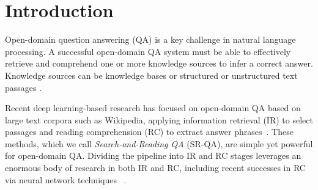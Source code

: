 \documentclass[letterpaper]{article} \usepackage{aaai18}  \usepackage{times}  \usepackage{helvet}  \usepackage{courier}  \usepackage{url}  \usepackage{graphicx}  \usepackage{comment}
\begin{document}
\section{Introduction}
Open-domain question answering (QA) is a key challenge in natural language processing. A successful open-domain QA system must be able to effectively retrieve and comprehend one or more knowledge sources to infer a correct answer. Knowledge sources can be knowledge bases \cite{berant2013semantic,yu2017improved} or structured or unstructured text passages \cite{ferrucci2010building,baudivs2015modeling}.

Recent deep learning-based research has focused on open-domain QA based on large text corpora such as Wikipedia, applying information retrieval (IR) to select passages and reading comprehension (RC) to extract answer phrases~\cite{chen2017reading,dhingra2017quasar}. 
These methods, which we call \emph{Search-and-Reading QA} (SR-QA), are simple yet powerful for open-domain QA.  Dividing the pipeline into IR and RC stages leverages an enormous body of research in both IR and RC, including recent successes in RC via neural network techniques
~\cite{wang2016machine,wang2016multi,xiong2016dynamic,wang2017gated}. 
\end{document}
